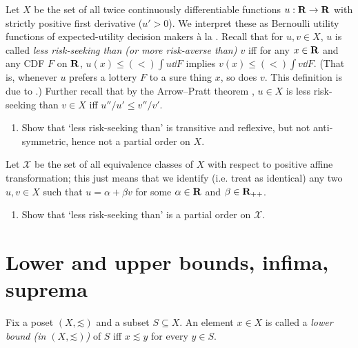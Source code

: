 \begin{exercise}
	\label{exercise:arrow-pratt}
	Let $X$ be the set of all twice continuously differentiable functions $u : \mathbf{R} \to \mathbf{R}$ with strictly positive first derivative ($u'>0$). We interpret these as Bernoulli utility functions of expected-utility decision makers à la \textcite{VonneumannMorgenstern1947}. Recall that for $u,v \in X$, $u$ is called \emph{less risk-seeking than (or more risk-averse than) $v$} iff for any $x \in \mathbf{R}$ and any CDF $F$ on $\mathbf{R}$, $u(x) \leq \mathrel{(<)} \int u \dd F$ implies $v(x) \leq \mathrel{(<)} \int v \dd F$. (That is, whenever $u$ prefers a lottery $F$ to a sure thing $x$, so does $v$. This definition is due to \textcite{Yaari1969}.) Further recall that by the Arrow--Pratt theorem \parencite{Arrow1965,Pratt1964}, $u \in X$ is less risk-seeking than $v \in X$ iff $u'' / u' \leq v''/v'$.
	
	\begin{enumerate}[label=(\alph*)]
	
		\item Show that `less risk-seeking than' is transitive and reflexive, but not anti-symmetric, hence not a partial order on $X$.

	\end{enumerate}
	Let $\mathcal{X}$ be the set of all equivalence classes of $X$ with respect to positive affine transformation; this just means that we identify (i.e. treat as identical) any two $u,v \in X$ such that $u = \alpha + \beta v$ for some $\alpha \in \mathbf{R}$ and $\beta \in \mathbf{R}_{++}$.

	\begin{enumerate}[label=(\alph*),resume]

		\item \label{item:arrow-pratt:b} Show that `less risk-seeking than' is a partial order on $\mathcal{X}$.
	
	\end{enumerate}
\end{exercise}



\section{Lower and upper bounds, infima, suprema}
\label{tar:bounds}

\begin{definition}
	\label{definition:lb}
	Fix a poset $(X,\mathord{\lesssim})$ and a subset $S \subseteq X$. An element $x \in X$ is called a \emph{lower bound (in $(X,\mathord{\lesssim})$)} of $S$ iff $x \lesssim y$ for every $y \in S$.
\end{definition}

